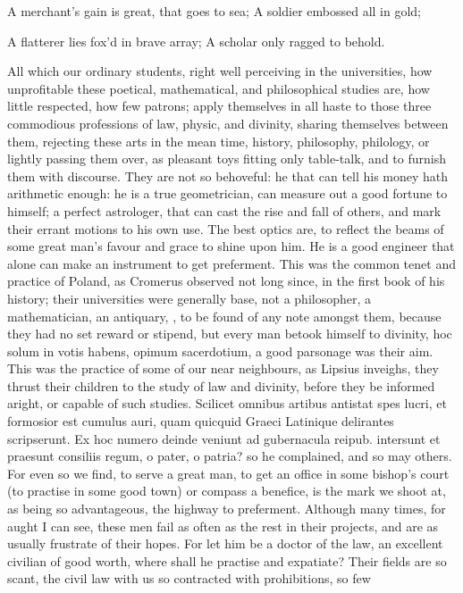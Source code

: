 {A merchant's gain is great, that goes to sea;
A soldier embossed all in gold;

A flatterer lies fox'd in brave array;
A scholar only ragged to behold.

All which our ordinary students, right well perceiving in the
universities, how unprofitable these poetical, mathematical, and
philosophical studies are, how little respected, how few patrons; apply
themselves in all haste to those three commodious professions of law,
physic, and divinity, sharing themselves between them, rejecting
these arts in the mean time, history, philosophy, philology, or lightly
passing them over, as pleasant toys fitting only table-talk, and to
furnish them with discourse. They are not so behoveful: he that can
tell his money hath arithmetic enough: he is a true geometrician, can
measure out a good fortune to himself; a perfect astrologer, that can
cast the rise and fall of others, and mark their errant motions to his
own use. The best optics are, to reflect the beams of some great man's
favour and grace to shine upon him. He is a good engineer that alone
can make an instrument to get preferment. This was the common tenet and
practice of Poland, as Cromerus observed not long since, in the first
book of his history; their universities were generally base, not a
philosopher, a mathematician, an antiquary, \etc{}, to be found of any
note amongst them, because they had no set reward or stipend, but every
man betook himself to divinity, hoc solum in votis habens, opimum
sacerdotium, a good parsonage was their aim. This was the practice of
some of our near neighbours, as Lipsius inveighs, they thrust
their children to the study of law and divinity, before they be
informed aright, or capable of such studies. Scilicet omnibus artibus
antistat spes lucri, et formosior est cumulus auri, quam quicquid
Graeci Latinique delirantes scripserunt. Ex hoc numero deinde veniunt
ad gubernacula reipub. intersunt et praesunt consiliis regum, o pater,
o patria? so he complained, and so may others. For even so we find, to
serve a great man, to get an office in some bishop's court (to practise
in some good town) or compass a benefice, is the mark we shoot at, as
being so advantageous, the highway to preferment.
Although many times, for aught I can see, these men fail as often as
the rest in their projects, and are as usually frustrate of their
hopes. For let him be a doctor of the law, an excellent civilian of
good worth, where shall he practise and expatiate? Their fields are so
scant, the civil law with us so contracted with prohibitions, so few
}
